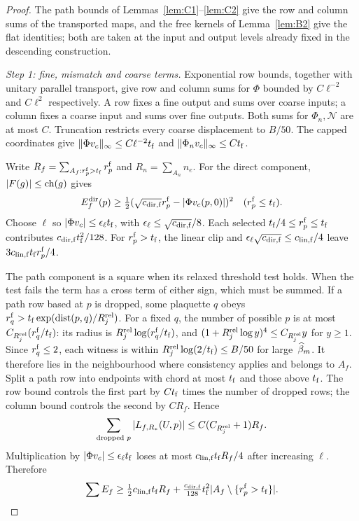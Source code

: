 \begin{proof}
The path bounds of Lemmas~\ref{lem:C1}--\ref{lem:C2} give the row and column sums of the transported maps, and the free kernels of Lemma~\ref{lem:B2} give the flat identities; both are taken at the input and output levels already fixed in the descending construction.

\emph{Step 1: fine, mismatch and coarse terms.} Exponential row bounds, together with unitary parallel transport, give row and column sums for $\Phi$ bounded by $C\ell^{-2}$ and $C\ell^2$ respectively. A row fixes a fine output and sums over coarse inputs; a column fixes a coarse input and sums over fine outputs. Both sums for $\Phi_n,\mathcal N$ are at most $C$. Truncation restricts every coarse displacement to $B/50$. The capped coordinates give $\|\Phi v_c\|_\infty\le C\ell^{-2}t_{\rm f}$ and $\|\Phi_nv_c\|_\infty\le Ct_{\rm f}$.

Write $R_f=\sum_{A_f:r^{\rm f}_p>t_{\rm f}}r^{\rm f}_p$ and $R_n=\sum_{A_n}n_e$. For the direct component, $|F(g)|\le\operatorname{ch}(g)$ gives
\begin{equation*}
E_f^{\rm dir}(p)\ge\tfrac12(\sqrt{c_{{\rm dir},{\rm f}}}r^{\rm f}_p-|\Phi v_c(p,0)|)^2\quad(r^{\rm f}_p\le t_{\rm f}).
\end{equation*}
Choose $\ell$ so $|\Phi v_c|\le\epsilon_\ell t_{\rm f}$, with $\epsilon_\ell\le\sqrt{c_{{\rm dir},{\rm f}}}/8$. Each selected $t_{\rm f}/4\le r^{\rm f}_p\le t_{\rm f}$ contributes $c_{{\rm dir},{\rm f}}t_{\rm f}^2/128$. For $r^{\rm f}_p>t_{\rm f}$, the linear clip and $\epsilon_\ell\sqrt{c_{{\rm dir},{\rm f}}}\le c_{{\rm lin},{\rm f}}/4$ leave $3c_{{\rm lin},{\rm f}}t_{\rm f}r^{\rm f}_p/4$.

The path component is a square when its relaxed threshold test holds. When the test fails the term has a cross term of either sign, which must be summed. If a path row based at $p$ is dropped, some plaquette $q$ obeys $r^{\rm f}_q>t_{\rm f}\exp(\operatorname{dist}(p,q)/R_j^{\rm rel})$. For a fixed $q$, the number of possible $p$ is at most $C_{R_j^{\rm rel}}(r^{\rm f}_q/t_{\rm f})$: its radius is $R_j^{\rm rel}\log(r^{\rm f}_q/t_{\rm f})$, and $(1+R_j^{\rm rel}\log y)^4\le C_{R_j^{\rm rel}}y$ for $y\ge1$. Since $r^{\rm f}_q\le2$, each witness is within $R_j^{\rm rel}\log(2/t_{\rm f})\le B/50$ for large~$\widehat{\beta}_m$. It therefore lies in the neighbourhood where consistency applies and belongs to $A_f$. Split a path row into endpoints with chord at most $t_{\rm f}$ and those above $t_{\rm f}$. The row bound controls the first part by $Ct_{\rm f}$ times the number of dropped rows; the column bound controls the second by $CR_f$. Hence
\begin{equation*}
\sum_{\text{dropped }p}|L_{f,R_*}(U,p)|\le C(C_{R_j^{\rm rel}}+1)R_f.
\end{equation*}
Multiplication by $|\Phi v_c|\le\epsilon_\ell t_{\rm f}$ loses at most $c_{{\rm lin},{\rm f}}t_{\rm f}R_f/4$ after increasing $\ell$. Therefore
\begin{equation*}
\sum E_f\ge\tfrac12c_{{\rm lin},{\rm f}}t_{\rm f}R_f+\tfrac{c_{{\rm dir},{\rm f}}}{128} t_{\rm f}^2|A_f\setminus\{r^{\rm f}_p>t_{\rm f}\}|.
\end{equation*}


\end{proof}
